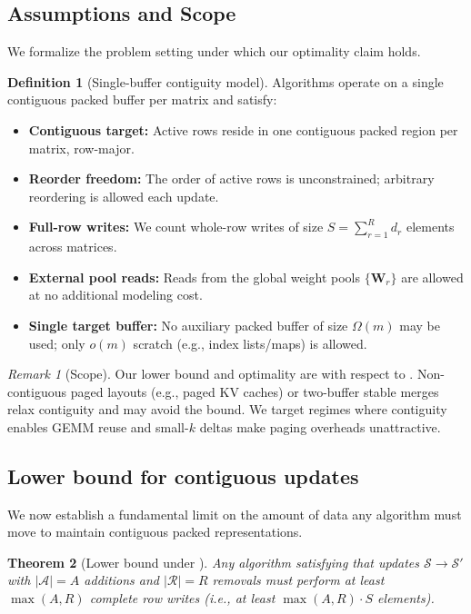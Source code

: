 \documentclass{article}
\numberwithin{equation}{section}
\theoremstyle{plain}
\newtheorem{theorem}{Theorem}[section]
\theoremstyle{definition}
\newtheorem{definition}{Definition}[section]
\theoremstyle{remark}
\newtheorem{remark}[theorem]{Remark}
\begin{document}
\subsection{Assumptions and Scope}

We formalize the problem setting under which our optimality claim holds.

\begin{definition}[Single-buffer contiguity model]
\label{def:contiguity-model}
Algorithms operate on a single contiguous packed buffer per matrix and satisfy:
\begin{itemize}
  \item \textbf{Contiguous target:} Active rows reside in one contiguous packed region per matrix, row-major.
  \item \textbf{Reorder freedom:} The order of active rows is unconstrained; arbitrary reordering is allowed each update.
  \item \textbf{Full-row writes:} We count whole-row writes of size $S = \sum_{r=1}^R d_r$ elements across matrices.
  \item \textbf{External pool reads:} Reads from the global weight pools $\{\mathbf{W}_r\}$ are allowed at no additional modeling cost.
  \item \textbf{Single target buffer:} No auxiliary packed buffer of size $\Omega(m)$ may be used; only $o(m)$ scratch (e.g., index lists/maps) is allowed.
\end{itemize}
\end{definition}

\begin{remark}[Scope]
Our lower bound and optimality are with respect to . Non-contiguous paged layouts (e.g., paged KV caches) or two-buffer stable merges relax contiguity and may avoid the bound. We target regimes where contiguity enables GEMM reuse and small-$k$ deltas make paging overheads unattractive.
\end{remark}

\subsection{Lower bound for contiguous updates}

We now establish a fundamental limit on the amount of data any algorithm must move to maintain contiguous packed representations.

\begin{theorem}[Lower bound under ]
\label{thm:lower_bound}
Any algorithm satisfying  that updates $\mathcal{S}\to\mathcal{S}'$ with $|\mathcal{A}|=A$ additions and $|\mathcal{R}|=R$ removals must perform at least $\max(A,R)$ complete row writes (i.e., at least $\max(A,R)\cdot S$ elements).
\end{theorem}
\end{document}
